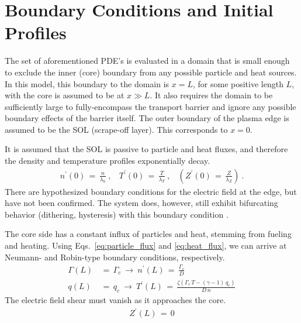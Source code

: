 \section{Boundary Conditions and Initial Profiles}\label{sec:boundary_conditions}
The set of aforementioned PDE's is evaluated in a domain that is small enough to exclude the inner (core) boundary from any possible particle and heat sources.
In this model, this boundary to the domain is $x = L$, for some positive length $L$, with the core is assumed to be at $x \gg L$.
It also requires the domain to be sufficiently large to fully-encompass the transport barrier and ignore any possible boundary effects of the barrier itself.
The outer boundary of the plasma edge is assumed to be the SOL (scrape-off layer).
This corresponds to $x = 0$.

It is assumed that the SOL is passive to particle and heat fluxes, and therefore the density and temperature profiles exponentially decay.
\begin{align} %
	n^\prime(0) \,=\, \frac{n}{\lambda_n}~, ~~~~
		T^\prime(0) \,=\, \frac{T}{\lambda_T}~, ~~~~
		\left(Z^\prime(0) \,=\, \frac{Z}{\lambda_Z}\right)~. \label{eq:SOL_boundary}
\end{align}
There are hypothesized boundary conditions for the electric field at the edge, but have not been confirmed.
The system does, however, still exhibit bifurcating behavior (dithering, hysteresis) with this boundary condition \cite{paquay_studying_2012}.

The core side has a constant influx of particles and heat, stemming from fueling and heating.
Using Eqs.~\ref{eq:particle_flux} and \ref{eq:heat_flux}, we can arrive at Neumann- and Robin-type boundary conditions, respectively.
\begin{align} %
	\Gamma(L) \,&=\, \Gamma_c ~\longrightarrow~ n^\prime(L)
		\,=\, \frac{\Gamma_c}{D} \label{eq:core_particle_flux}\\
	q(L) \,&=\, q_c ~\longrightarrow~ T^\prime(L) \,=\, \frac{\zeta(
		\Gamma_c \, T - (\gamma - 1)\,q_c)}{D \, n} \label{eq:core_heat_flux}
\end{align}
The electric field shear must vanish as it approaches the core.
\begin{align} %
	Z^\prime(L) \,=\, 0 \label{eq:core_Z_boundary}
\end{align}


